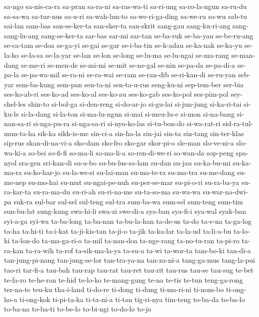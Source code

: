 {sa-ngo sa-nis-ca-ra sa-pran sa-ra-ni sa-ras-wa-ti sa-ri-ung sa-ro-la-ngun
sa-ru-du sa-sa-wa sa-tur-nus sa-u-ri sa-wah-lun-to sa-we-ri-ga-ding
sa-we-ru sa-wu sab-tu sai-lan sam-bas san-se-ker-ta san-sker-ta san-skrit
sang-gau sang-ku-ri-ang sang-sang-lu-ang sang-se-ker-ta sar-bas sar-mi
sar-tan se-ba-ruk se-ba-yau se-be-ru-ang se-ca-tam se-doa se-ga-yi se-gai
se-gar se-i-ba-tin se-k-adau se-ka-nak se-ka-yu se-la-ko se-la-sa
se-la-yar se-lan se-lon se-long se-lu-ma se-lu-ngai se-ma-rang se-man-dang
se-me-ri se-men-de se-mi-mi se-mit se-ne-gal se-nin se-pa-da se-pa-di-a
se-pa-la se-pa-wa-mil se-ra-ni se-ra-wai se-ram se-ran-dib se-ri-kan-di
se-ru-yan seb-yar sem-ba-kung sem-pan sen-ta-ni sen-ta-u-rus seng-ku-ni
sep-tem-ber ser-bia ses-ko-ab-ri ses-ko-ad ses-ko-al ses-ko-au ses-ko-gab
ses-ko-pol ses-pim-pol sey-chel-les shin-to si-bol-ga si-den-reng
si-do-ar-jo si-gu-lai si-jun-jung si-ka-ri-tai si-ku-le si-la-dang
si-la-ton si-ma-lu-ngun si-mai si-meu-lu-e si-mon si-na-bang si-nan-sa-ri
si-nga-pu-ra si-nga-sa-ri si-nyo-ko-las si-tu-bon-do si-wa-rat-ri
sid-ra-tul-mun-ta-ha sik-ka sikh-is-me sin-ci-a sin-ha-la sin-jai sin-ta
sin-tang sin-ter-klas sip-rus skan-di-na-vi-a sko-dam sko-fro sko-gar
skor-pi-o sle-man slo-ve-ni-a slo-wa-ki-a so-bei so-fi-fi so-ma-li
so-ma-li-a so-ren-di-we-ri so-wan-da sop-peng spa-nyol sra-gen sri-kan-di
su-a-bo su-bu-lus-sa-lam su-dan su-jau su-ka-bu-mi su-ka-ma-ra
su-ko-har-jo su-la-we-si su-lai-man su-ma-te-ra su-ma-tra su-me-dang
su-me-nep su-mo-hai su-mut su-ngai-pe-nuh su-per-se-mar su-pi-o-ri
su-ra-ba-ya su-ra-kar-ta su-ra-ma-du su-ri-ah su-ri-na-me su-ta-so-ma
su-wa-wa su-war-na-dwi-pa suk-ra sul-bar sul-sel sul-teng sul-tra
sum-ba-wa sum-sel sum-teng sum-tim sun-bu-lat sung-kung swa-hi-li swa-zi
swe-di-a sya-ban sya-fi-i sya-wal syak-ban syi-a-ga syi-wa ta-ba-long
ta-ba-nan ta-bu-la-han ta-de-us ta-do ta-e-na ta-ga-log ta-ha ta-hi-ti
ta-i-kat ta-ji-kis-tan ta-ji-o ta-jik ta-ka-lar ta-la-ud ta-li-a-bu
ta-lo-ki ta-lon-do ta-ma-ga-ri-o ta-mil ta-nan-doa ta-nge-rang
ta-no-tu-ran ta-pi-ro ta-ra-kan ta-ra-wih ta-rof ta-sik-ma-la-ya ta-su-a
ta-wi ta-wor-ta tam-bo-ki tan-di-a tan-jung-pi-nang tan-jung-se-lor
tan-tra-ya-na tan-za-ni-a tang-ga-mus tang-la-pui tao-ri tar-fi-a tau-bah
tau-rap tau-rat tau-ret tau-rit tau-rus tau-se tau-sug te-bet te-fa-ro
te-he-ran te-hid te-lo-ko te-mang-gung te-na te-tis te-tun teng-ga-rong
ter-na-te teu-ku tha-i-land ti-do-re ti-dong ti-dung ti-mo-ri-ni ti-nom-bo
ti-ong-ho-a ti-ong-kok ti-pi-ta-ka ti-ta-ni-a ti-tan tig-ri-nya tim-teng
to-ba-da to-ba-lo to-ba-na to-ba-ti to-be-lo to-bi-ngi to-do-lo to-jo
}
